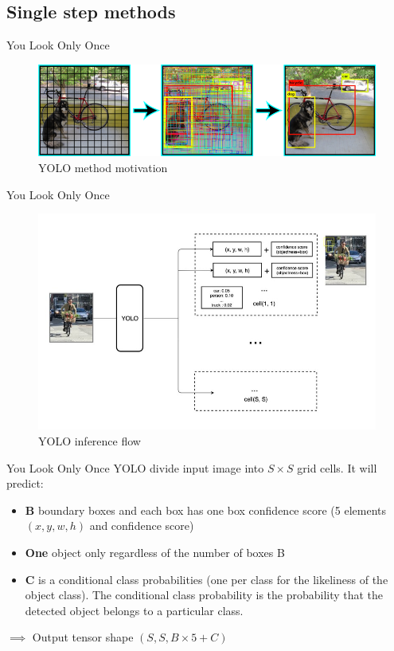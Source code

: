 \documentclass[aspectratio=169]{beamer}
\begin{document}
\subsection{Single step methods}
\begin{frame}{You Look Only Once}
\begin{figure}
    \centering
    \includegraphics[scale=.4]{demo/figs/yolo1.png}
    \caption{YOLO method motivation}
\end{figure}
\end{frame}

\begin{frame}{You Look Only Once}
\begin{figure}
    \centering
    \includegraphics[scale=.4]{demo/figs/yolo2.jpeg}
    \caption{YOLO inference flow}
\end{figure}
\end{frame}

\begin{frame}{You Look Only Once}
YOLO divide input image into $S\times S$ grid cells. It will predict:
\begin{itemize}
    \item \textbf{B} boundary boxes and each box has one box confidence score (5 elements $(x, y, w, h)$ and confidence score)
    \item \textbf{One} object only regardless of the number of boxes B
    \item \textbf{C} is a conditional class probabilities (one per class for the likeliness of the object class). The conditional class probability is the probability that the detected object belongs to a particular class.
\end{itemize}
$\implies$ Output tensor shape $(S, S, B\times 5 + C)$
\end{frame}
\end{document}
